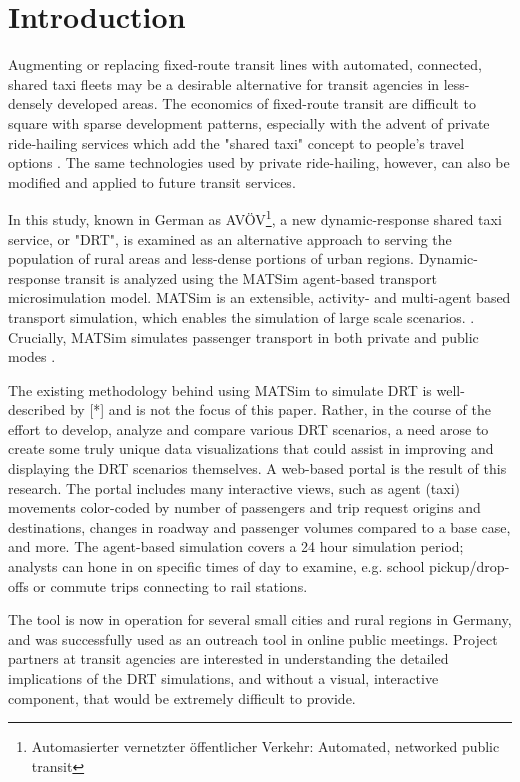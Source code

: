 \documentclass[3p,times,procedia]{elsarticle}
\begin{document}

\section{Introduction}
\label{introduction}

Augmenting or replacing fixed-route transit lines with automated, connected, shared taxi fleets may be a desirable alternative for transit agencies in less-densely developed areas. The economics of fixed-route transit are difficult to square with sparse development patterns, especially with the advent of private ride-hailing services which add the "shared taxi" concept to people's travel options \cite{Hough2018}. The same technologies used by private ride-hailing, however, can also be modified and applied to future transit services.

In this study, known in German as AVÖV\footnote{Automasierter vernetzter öffentlicher Verkehr: Automated, networked public transit}, a new dynamic-response shared taxi service, or "DRT", is examined as an alternative approach to serving the population of rural areas and less-dense portions of urban regions. Dynamic-response transit is analyzed using the MATSim agent-based transport microsimulation model. MATSim is an extensible, activity- and multi-agent based transport simulation, which enables the simulation of large scale scenarios. \cite{MATSimBook}. Crucially, MATSim simulates passenger transport in both private and public modes \cite{ZiemkeEtAl2019OpenBerlinScenario}.

The existing methodology behind using MATSim to simulate DRT is well-described by [*] and is not the focus of this paper. Rather, in the course of the effort to develop, analyze and compare various DRT scenarios, a need arose to create some truly unique data visualizations that could assist in improving and displaying the DRT scenarios themselves. A web-based portal is the result of this research. The portal includes many interactive views, such as agent (taxi) movements color-coded by number of passengers and trip request origins and destinations, changes in roadway and passenger volumes compared to a base case, and more. The agent-based simulation covers a 24 hour simulation period; analysts can hone in on specific times of day to examine, e.g. school pickup/drop-offs or commute trips connecting to rail stations.

The tool is now in operation for several small cities and rural regions in Germany, and was successfully used as an outreach tool in online public meetings. Project partners at transit agencies are interested in understanding the detailed implications of the DRT simulations, and without a visual, interactive component, that would be extremely difficult to provide.
\end{document}

